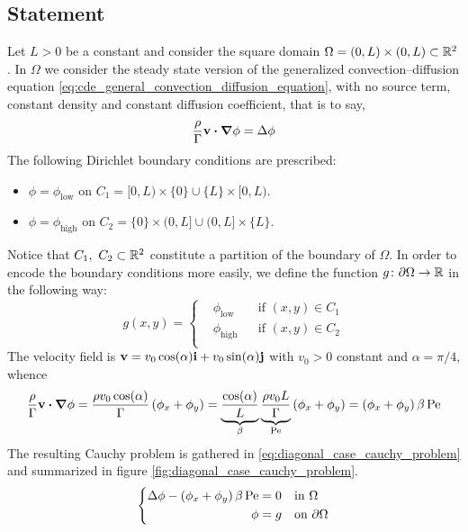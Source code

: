 
\subsection{Statement}

Let $L > 0$ be a constant and consider the square domain $\Omega = (0,L) \times
(0,L) \subset \mathbb{R}^2$. In $\Omega$ we consider the steady state version of the
generalized convection--diffusion equation
\eqref{eq:cde_general_convection_diffusion_equation}, with no source term,
constant density and constant diffusion coefficient, that is to say,
\begin{equation*}
	\frac{\rho}{\Gamma} \vb{v} \vdot \grad{\phi} = \Delta{\phi}
\end{equation*}
The following Dirichlet boundary conditions are prescribed:
\begin{itemize}[topsep=0pt]
	\item $\phi = \phi_\text{low}$ on $C_1 = [0,L) \times \{ 0 \} \cup \{ L \}
	\times [0,L)$.
	\item $\phi = \phi_\text{high}$ on $C_2 = \{ 0 \} \times (0,L] \cup (0,L]
	\times \{ L \}$.
\end{itemize}
Notice that $C_1, \ C_2 \subset \mathbb{R}^2$ constitute a partition of the boundary
of $\Omega$. In order to encode the boundary conditions more easily, we define
the function $g \colon \partial\Omega \rightarrow \mathbb{R}$ in the following way:
\begin{equation*}
	g(x,y) =
	\left\{
	\begin{aligned}
		&\phi_\text{low} 	& &\text{if } (x,y) \in C_1 \\
		&\phi_\text{high} 	& &\text{if } (x,y) \in C_2 \\
	\end{aligned}
	\right.
\end{equation*}
The velocity field is $\vb{v} = v_0 \cos(\alpha) \vb{i} + v_0 \sin(\alpha)
\vb{j}$ with $v_0 > 0$ constant and $\alpha = \pi / 4$, whence
\begin{equation*}
	\frac{\rho}{\Gamma} \vb{v} \vdot \grad{\phi} = 
	\frac{\rho v_0 \cos(\alpha)}{\Gamma} \left( \phi_x + \phi_y \right) = 
	\underbrace{\frac{\cos(\alpha)}{L}}_{\beta} 
	\underbrace{\frac{\rho v_0 L}{\Gamma}}_{\peclet} \left( \phi_x + \phi_y \right) = 
	\left( \phi_x + \phi_y \right) \beta \, \peclet 
\end{equation*}
The resulting Cauchy problem is gathered in
\eqref{eq:diagonal_case_cauchy_problem} and summarized in figure
\ref{fig:diagonal_case_cauchy_problem}.
\begin{equation} \label{eq:diagonal_case_cauchy_problem}
	\left\{
	\begin{aligned}
		\Delta \phi - \left( \phi_x + \phi_y \right) \beta \, \mathrm{Pe} &= 0 &
		&\text{in } \Omega \\
		\phi &= g &
		&\text{on } \partial \Omega
	\end{aligned}
	\right.
\end{equation}
